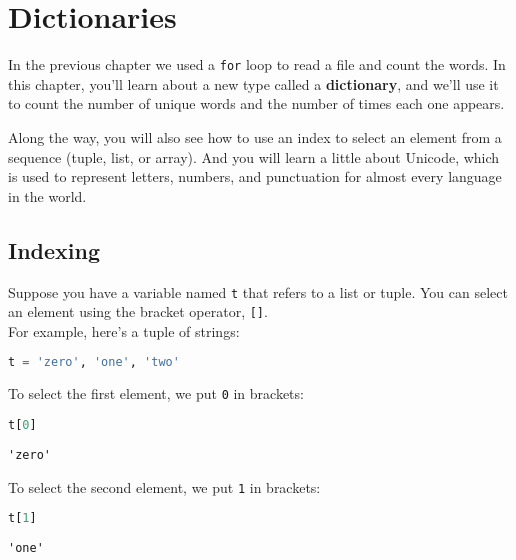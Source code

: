 \hypertarget{dictionaries}{%
\chapter{Dictionaries}\label{dictionaries}}

In the previous chapter we used a \passthrough{\lstinline!for!} loop to
read a file and count the words. In this chapter, you'll learn about a
new type called a \textbf{dictionary}, and we'll use it to count the
number of unique words and the number of times each one appears.

Along the way, you will also see how to use an index to select an
element from a sequence (tuple, list, or array). And you will learn a
little about Unicode, which is used to represent letters, numbers, and
punctuation for almost every language in the world.

\hypertarget{indexing}{%
\section{Indexing}\label{indexing}}

Suppose you have a variable named \passthrough{\lstinline!t!} that
refers to a list or tuple. You can select an element using the bracket
operator, \passthrough{\lstinline![]!}.\\
For example, here's a tuple of strings:

\begin{lstlisting}[language=Python,style=source]
t = 'zero', 'one', 'two'
\end{lstlisting}

To select the first element, we put \passthrough{\lstinline!0!} in
brackets:

\begin{lstlisting}[language=Python,style=source]
t[0]
\end{lstlisting}

\begin{lstlisting}[style=output]
'zero'
\end{lstlisting}

To select the second element, we put \passthrough{\lstinline!1!} in
brackets:

\begin{lstlisting}[language=Python,style=source]
t[1]
\end{lstlisting}

\begin{lstlisting}[style=output]
'one'
\end{lstlisting}

